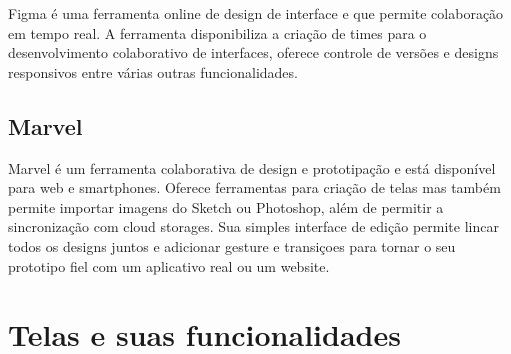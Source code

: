 Figma \cite{figma} é uma ferramenta online de design de interface e que permite colaboração em tempo real. A ferramenta disponibiliza a criação de times para o desenvolvimento colaborativo de interfaces, oferece controle de versões e designs responsivos entre várias outras funcionalidades.


\subsection{Marvel}

Marvel \cite{marvel} é um ferramenta colaborativa de design e prototipação e está disponível para web e smartphones. Oferece ferramentas para criação de telas mas também permite importar imagens do Sketch ou Photoshop, além de permitir a sincronização com cloud storages. Sua simples interface de edição permite lincar todos os designs juntos e adicionar gesture e transiçoes para tornar o seu prototipo fiel com um aplicativo real ou um website.

\section{Telas e suas funcionalidades}